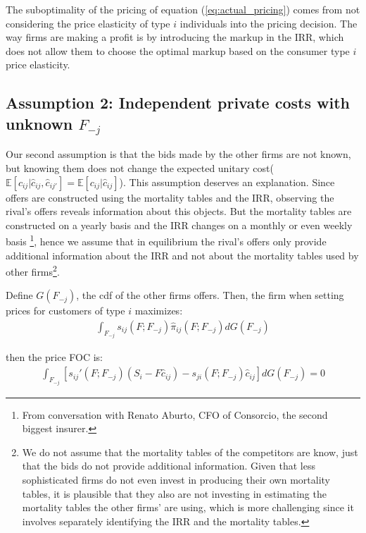 \documentclass[12pt]{article}
\theoremstyle{plain}
\theoremstyle{plain}
\begin{document}
The suboptimality of the pricing of equation (\ref{eq:actual_pricing}) comes from not considering the price elasticity of type $i$ individuals into the pricing decision. 
The way firms are making a profit is by introducing the markup in the IRR, which does not allow them to choose the optimal markup based on the consumer type $i$ price elasticity. 

 



\subsection{Assumption 2: Independent private costs with unknown $F_{-j}$ }\label{sec:interdependent}

Our second assumption is  that the bids made by the other firms are not known, but knowing them does not change the expected unitary cost($\mathbb{E}[c_{ij}|\hat{c}_{ij}, \hat{c}_{ij'}] = \mathbb{E}[c_{ij}|\hat{c}_{ij}]$). 
This assumption deserves an explanation. Since offers are constructed using the mortality tables and the IRR, observing the rival's offers reveals information about this objects. But the mortality tables are constructed on a yearly basis and the IRR changes on a monthly or even weekly basis \footnote{From conversation with Renato Aburto, CFO of Consorcio, the second biggest insurer.}, hence we assume that in equilibrium the rival's offers only provide additional information about the IRR and not about the mortality tables used by other firms\footnote{We do not assume that the mortality tables of the competitors are know, just that the bids do not provide additional information. Given that less sophisticated firms do not even invest in producing their own mortality tables, it is plausible that they also are not investing in estimating the mortality tables the other firms' are using, which is more challenging since it involves separately identifying the IRR and the mortality tables. }. 

Define $G(F_{-j})$, the cdf of the other firms offers. Then, the firm when setting prices for customers of type $i$ maximizes: 
\begin{align*}
    \int_{F_{-j}} s_{ij}(F; F_{-j})\hat{\pi}_{ij}(F;F_{-j}) dG(F_{-j})
\end{align*}


then the price FOC is: 
\begin{align*}
    \int_{F_{-j}} \left[s_{ij}'(F; F_{-j}) \left(S_{i}-F\hat{c}_{ij}\right)- s_{ji}(F; F_{-j}) \hat{c}_{ij}  \right]dG(F_{-j})=0
\end{align*} 
\end{document}
